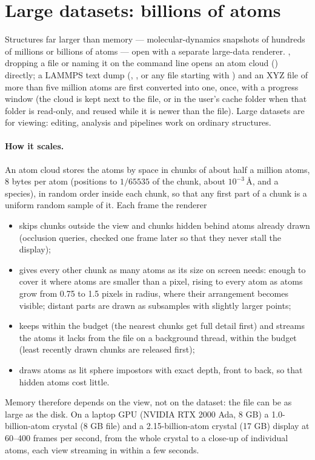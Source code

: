 \section{Large datasets: billions of atoms}\label{sec:large-datasets}
Structures far larger than memory --- molecular-dynamics snapshots of hundreds of millions or billions of atoms --- open with a separate large-data renderer. , dropping a file or naming it on the command line opens an atom cloud () directly; a LAMMPS text dump (, , or any file starting with ) and an XYZ file of more than five million atoms are first converted into one, once, with a progress window (the cloud is kept next to the file, or in the user's cache folder when that folder is read-only, and reused while it is newer than the file). Large datasets are for viewing: editing, analysis and pipelines work on ordinary structures.

\paragraph{How it scales.} An atom cloud stores the atoms by space in chunks of about half a million atoms, 8 bytes per atom (positions to $1/65535$ of the chunk, about $10^{-3}$\,\AA, and a species), in random order inside each chunk, so that any first part of a chunk is a uniform random sample of it. Each frame the renderer
\begin{itemize}
\item skips chunks outside the view and chunks hidden behind atoms already drawn (occlusion queries, checked one frame later so that they never stall the display);
\item gives every other chunk as many atoms as its size on screen needs: enough to cover it where atoms are smaller than a pixel, rising to every atom as atoms grow from 0.75 to 1.5 pixels in radius, where their arrangement becomes visible; distant parts are drawn as subsamples with slightly larger points;
\item keeps within the  budget (the nearest chunks get full detail first) and streams the atoms it lacks from the file on a background thread, within the  budget (least recently drawn chunks are released first);
\item draws atoms as lit sphere impostors with exact depth, front to back, so that hidden atoms cost little.
\end{itemize}
Memory therefore depends on the view, not on the dataset: the file can be as large as the disk. On a laptop GPU (NVIDIA RTX 2000 Ada, 8 GB) a 1.0-billion-atom crystal (8 GB file) and a 2.15-billion-atom crystal (17 GB) display at 60--400 frames per second, from the whole crystal to a close-up of individual atoms, each view streaming in within a few seconds.

